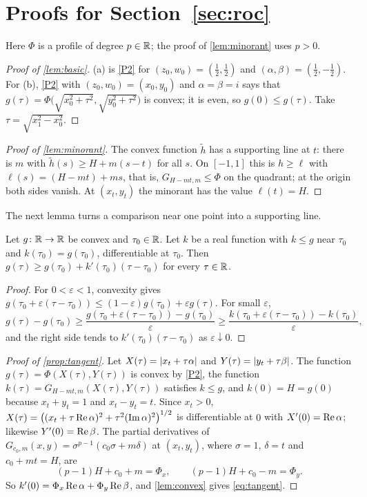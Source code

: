 \section{Proofs for Section~\ref{sec:roc}}\label{app:roc}

Here $\Phi$ is a profile of degree $p\in\mathbb{R}$; the proof of \cref{lem:minorant} uses $p>0$.

\begin{proof}[Proof of \cref{lem:basic}]
(a) is \ref{P2} for $(z_0,w_0)=(\tfrac12,\tfrac12)$ and $(\alpha,\beta)=(\tfrac12,-\tfrac12)$.
For (b), \ref{P2} with $(z_0,w_0)=(x_0,y_0)$ and $\alpha=\beta=i$ says that
$g(\tau)=\Phi\bigl(\sqrt{x_0^2+\tau^2},\sqrt{y_0^2+\tau^2}\bigr)$ is convex; it is even, so
$g(0)\le g(\tau)$. Take $\tau=\sqrt{x_1^2-x_0^2}$.
\end{proof}

\begin{proof}[Proof of \cref{lem:minorant}]
The convex function $\tilde h$ has a supporting line at $t$: there is $m$ with
$\tilde h(s)\ge H+m(s-t)$ for all $s$. On $[-1,1]$ this is $h\ge\ell$ with $\ell(s)=(H-mt)+ms$,
that is, $G_{H-mt,m}\le\Phi$ on the quadrant; at the origin both sides vanish. At $(x_t,y_t)$
the minorant has the value $\ell(t)=H$.
\end{proof}

The next lemma turns a comparison near one point into a supporting line.

\begin{lemma}\label{lem:convex}
Let $g\colon\mathbb{R}\to\mathbb{R}$ be convex and $\tau_0\in\mathbb{R}$. Let $k$ be a real function with $k\le g$
near $\tau_0$ and $k(\tau_0)=g(\tau_0)$, differentiable at $\tau_0$. Then
$g(\tau)\ge g(\tau_0)+k'(\tau_0)(\tau-\tau_0)$ for every $\tau\in\mathbb{R}$.
\end{lemma}

\begin{proof}
For $0<\varepsilon<1$, convexity gives
$g(\tau_0+\varepsilon(\tau-\tau_0))\le(1-\varepsilon)g(\tau_0)+\varepsilon g(\tau)$. For small
$\varepsilon$,
\[
  g(\tau)-g(\tau_0)\ge\frac{g(\tau_0+\varepsilon(\tau-\tau_0))-g(\tau_0)}{\varepsilon}
  \ge\frac{k(\tau_0+\varepsilon(\tau-\tau_0))-k(\tau_0)}{\varepsilon},
\]
and the right side tends to $k'(\tau_0)(\tau-\tau_0)$ as $\varepsilon\downarrow0$.
\end{proof}

\begin{proof}[Proof of \cref{prop:tangent}]
Let $X(\tau)=\lvert x_t+\tau\alpha\rvert$ and $Y(\tau)=\lvert y_t+\tau\beta\rvert$. The function
$g(\tau)=\Phi(X(\tau),Y(\tau))$ is convex by \ref{P2}, the function
$k(\tau)=G_{H-mt,m}(X(\tau),Y(\tau))$ satisfies $k\le g$, and $k(0)=H=g(0)$ because
$x_t+y_t=1$ and $x_t-y_t=t$. Since $x_t>0$,
$X(\tau)=\bigl((x_t+\tau\operatorname{Re}\alpha)^2+\tau^2(\operatorname{Im}\alpha)^2\bigr)^{1/2}$ is differentiable at $0$
with $X'(0)=\operatorname{Re}\alpha$; likewise $Y'(0)=\operatorname{Re}\beta$. The partial derivatives of
$G_{c_0,m}(x,y)=\sigma^{p-1}(c_0\sigma+m\delta)$ at $(x_t,y_t)$, where $\sigma=1$,
$\delta=t$ and $c_0+mt=H$, are
\[
  (p-1)H+c_0+m=\Phi_x,\qquad(p-1)H+c_0-m=\Phi_y .
\]
So $k'(0)=\Phi_x\operatorname{Re}\alpha+\Phi_y\operatorname{Re}\beta$, and \cref{lem:convex} gives \eqref{eq:tangent}.
\end{proof}

